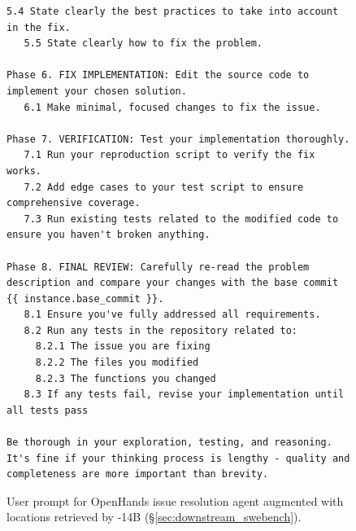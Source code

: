 \begin{figure}[!ht]
    \centering
\begin{tcolorbox}[colback=blue!6!white, colframe=blue!45!white, title={\small User Prompt for OpenHands Issue Resolution Agent Augmented with Locations Retrieved by \methodname-14B (continued)}]
\begin{lstlisting}[basicstyle=\fontsize{7.7}{8}\ttfamily]
   5.4 State clearly the best practices to take into account in the fix.
   5.5 State clearly how to fix the problem.

Phase 6. FIX IMPLEMENTATION: Edit the source code to implement your chosen solution.
   6.1 Make minimal, focused changes to fix the issue.

Phase 7. VERIFICATION: Test your implementation thoroughly.
   7.1 Run your reproduction script to verify the fix works.
   7.2 Add edge cases to your test script to ensure comprehensive coverage.
   7.3 Run existing tests related to the modified code to ensure you haven't broken anything.

Phase 8. FINAL REVIEW: Carefully re-read the problem description and compare your changes with the base commit {{ instance.base_commit }}.
   8.1 Ensure you've fully addressed all requirements.
   8.2 Run any tests in the repository related to:
     8.2.1 The issue you are fixing
     8.2.2 The files you modified
     8.2.3 The functions you changed
   8.3 If any tests fail, revise your implementation until all tests pass

Be thorough in your exploration, testing, and reasoning. It's fine if your thinking process is lengthy - quality and completeness are more important than brevity.
\end{lstlisting}
\end{tcolorbox}
\caption{User prompt for OpenHands issue resolution agent augmented with locations retrieved by \methodname-14B (\S\ref{sec:downstream_swebench}).
\label{fig:user_prompt_codescout_augment2}
}
\end{figure}

